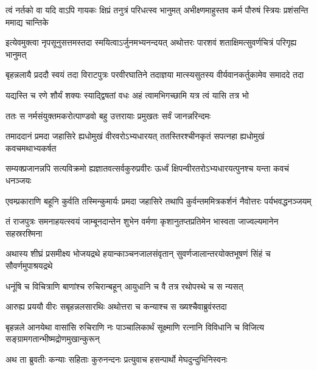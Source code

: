 


\twolineshloka
{त्वं नर्तको वा यदि वाऽपि गायकः क्षिप्रं तनुत्रं परिधत्स्व भानुमत्}
{अभीक्ष्णमाहुस्तव कर्म पौरुषं स्त्रियः प्रशंसन्ति ममाद्य चान्तिके}



\twolineshloka
{इत्येवमुक्त्वा नृपसूनुसत्तमस्तदा स्मयित्वाऽर्जुनमभ्यनन्दयत्}
{अथोत्तरः पारशवं शताक्षिमत्सुवर्णचित्रं परिगृह्य भानुमत्}


\twolineshloka
{बृहन्नलायै प्रददौ स्वयं तदा विराटपुत्रः परवीरघातिने}
{तदाज्ञया मात्स्यसुतस्य वीर्यवानकर्तुकामेव समाददे तदा}




\twolineshloka
{यद्यस्ति च रणे शौर्यं शक्यः स्याद्द्विषतां वधः}
{अहं त्वामभिगच्छामि यत्र त्वं यासि तत्र भो}



\twolineshloka
{ततः स नर्मसंयुक्तमकरोत्पाण्डवो बहु}
{उत्तरायाः प्रमुखतः सर्वं जानन्नरिन्दमः}


\twolineshloka
{तमाददानं प्रमदा जहासिरे ह्यधोमुखं वीरवरोऽभ्यधारयत्}
{ततस्तिरश्चीनकृतं सपत्नहा ह्यधोमुखं कवचमथाभ्यकर्षत}


\twolineshloka
{सम्यक्प्रजानन्नपि सत्यविक्रमो ह्यज्ञातवत्सर्वकुरुप्रवीरः}
{ऊर्ध्वं क्षिपन्वीरतरोऽभ्यधारयत्पुनश्च यन्ता कवचं धनञ्जयः}


\twolineshloka
{एवम्प्रकाराणि बहूनि कुर्वति तस्मिन्कुमार्यः प्रमदा जहासिरे}
{तथापि कुर्वन्तममित्रकर्शनं नैवोत्तरः पर्यभवद्धनञ्जयम्}


\twolineshloka
{तं राजपुत्रः समनाहयत्स्वयं जाम्बूनदान्तेन शुभेन वर्मणा}
{कृशानुतप्तप्रतिमेन भास्वता जाज्वल्यमानेन सहस्ररश्मिना}


\twolineshloka
{अथास्य शीघ्रं प्रसमीक्ष्य भोजयद्रथे हयान्काञ्चनजालसंवृतान्}
{सुवर्णजालान्तरयोक्तभूषणं सिंहं च सौवर्णमुपाश्रयद्रथे}


\twolineshloka
{धनूंषि च विचित्राणि बाणांश्च रुचिरान्बहून्}
{आयुधानि च वै तत्र रथोपस्थे च स न्यसत्}


\twolineshloka
{आरुह्य प्रययौ वीरः सबृहन्नलसारथिः}
{अथोत्तरा च कन्याश्च स ख्यश्चैवाब्रुवंस्तदा}


\threelineshloka
{बृहन्नले आनयेथा वासांसि रुचिराणि नः}
{पाञ्चालिकार्थं सूक्ष्माणि रत्नानि विविधानि च}
{विजित्य सङ्ग्रामगतान्भीष्मद्रोणमुखान्कुरून्}


\twolineshloka
{अथ ता ब्रुवतीः कन्याः सहिताः कुरुनन्दनः}
{प्रत्युवाच हसन्पार्थो मेघदुन्दुभिनिस्वनः}


